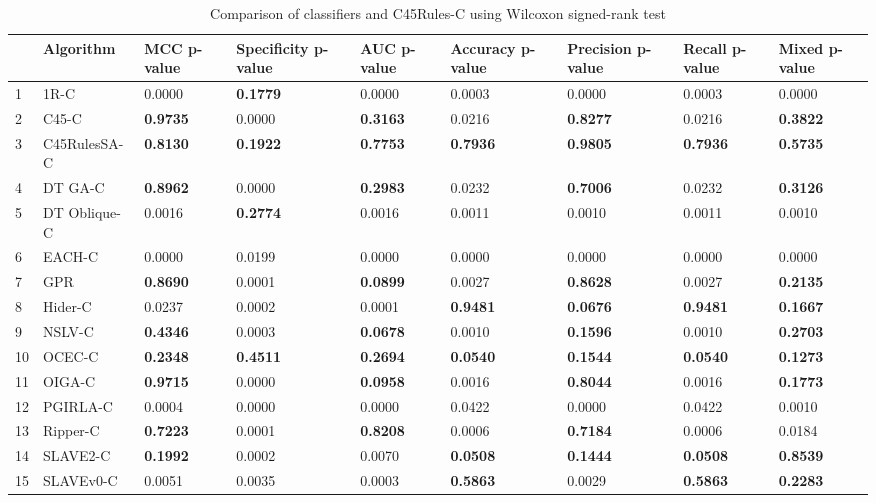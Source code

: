 \begin{table}
\footnotesize
\caption{Comparison of classifiers and C45Rules-C using Wilcoxon signed-rank test}
\label{tab:wilcoxon comparison}
\begin{tabular}{lllllllll}
\hline
 & Algorithm & MCC p-value & Specificity p-value & AUC p-value & Accuracy p-value & Precision p-value & Recall p-value & Mixed p-value \\
\hline
1 & 1R-C & 0.0000 & \textbf{0.1779} & 0.0000 & 0.0003 & 0.0000 & 0.0003 & 0.0000 \\
2 & C45-C & \textbf{0.9735} & 0.0000 & \textbf{0.3163} & 0.0216 & \textbf{0.8277} & 0.0216 & \textbf{0.3822} \\
3 & C45RulesSA-C & \textbf{0.8130} & \textbf{0.1922} & \textbf{0.7753} & \textbf{0.7936} & \textbf{0.9805} & \textbf{0.7936} & \textbf{0.5735} \\
4 & DT GA-C & \textbf{0.8962} & 0.0000 & \textbf{0.2983} & 0.0232 & \textbf{0.7006} & 0.0232 & \textbf{0.3126} \\
5 & DT Oblique-C & 0.0016 & \textbf{0.2774} & 0.0016 & 0.0011 & 0.0010 & 0.0011 & 0.0010 \\
6 & EACH-C & 0.0000 & 0.0199 & 0.0000 & 0.0000 & 0.0000 & 0.0000 & 0.0000 \\
7 & GPR & \textbf{0.8690} & 0.0001 & \textbf{0.0899} & 0.0027 & \textbf{0.8628} & 0.0027 & \textbf{0.2135} \\
8 & Hider-C & 0.0237 & 0.0002 & 0.0001 & \textbf{0.9481} & \textbf{0.0676} & \textbf{0.9481} & \textbf{0.1667} \\
9 & NSLV-C & \textbf{0.4346} & 0.0003 & \textbf{0.0678} & 0.0010 & \textbf{0.1596} & 0.0010 & \textbf{0.2703} \\
10 & OCEC-C & \textbf{0.2348} & \textbf{0.4511} & \textbf{0.2694} & \textbf{0.0540} & \textbf{0.1544} & \textbf{0.0540} & \textbf{0.1273} \\
11 & OIGA-C & \textbf{0.9715} & 0.0000 & \textbf{0.0958} & 0.0016 & \textbf{0.8044} & 0.0016 & \textbf{0.1773} \\
12 & PGIRLA-C & 0.0004 & 0.0000 & 0.0000 & 0.0422 & 0.0000 & 0.0422 & 0.0010 \\
13 & Ripper-C & \textbf{0.7223} & 0.0001 & \textbf{0.8208} & 0.0006 & \textbf{0.7184} & 0.0006 & 0.0184 \\
14 & SLAVE2-C & \textbf{0.1992} & 0.0002 & 0.0070 & \textbf{0.0508} & \textbf{0.1444} & \textbf{0.0508} & \textbf{0.8539} \\
15 & SLAVEv0-C & 0.0051 & 0.0035 & 0.0003 & \textbf{0.5863} & 0.0029 & \textbf{0.5863} & \textbf{0.2283} \\
\hline
\end{tabular}
\end{table}
